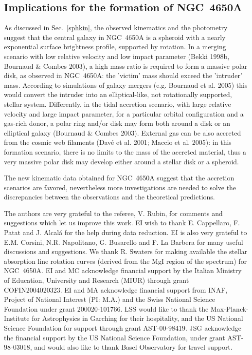 \documentclass[12pt,preprint]{aastex}
\begin{document}
\subsection{Implications for the formation of NGC~4650A} 

As discussed in Sec.~\ref{sphkin}, the observed kinematics and the
photometry suggest that the central galaxy in NGC~4650A is a spheroid
with a nearly exponential surface brightness profile, supported by
rotation.  In a merging scenario with low relative velocity and low
impact parameter (Bekki 1998b, Bournaud \& Combes 2003), a high mass
ratio is required to form a massive polar disk, as observed in
NGC~4650A: the 'victim' mass should exceed the 'intruder'
mass. According to simulations of galaxy mergers (e.g. Bournaud et
al. 2005) this would convert the intruder into an elliptical-like, not
rotationally supported, stellar system. Differently, in the tidal
accretion scenario, with large relative velocity and large impact
parameter, for a particular orbital configuration and a gas-rich
donor, a polar ring and/or disk may form both around a disk or an
elliptical galaxy (Bournaud \& Combes 2003). External gas can be also
accreted from the cosmic web filaments (Dav\'e et al. 2001; Maccio et
al. 2005): in this formation scenario, there is no limits to the mass
of the accreted material, thus a very massive polar disk may develop
either around a stellar disk or a spheroid. 

The new kinematic data obtained for NGC~4650A suggest that the
accretion scenarios are favored, nevertheless more investigations are
needed to solve the discrepancies between the observations and the
theoretical predictions.


\acknowledgments
The authors are very grateful to the referee, V. Rubin, for comments and
suggestions which let us improve this work.  EI wish to thank E. Cappellaro,
F. Patat and J. Alcal\'{a} for the help during data reduction. EI is
also very grateful to E.M. Corsini, N.R. Napolitano, G. Busarello and
F. La Barbera for many useful discussions and suggestions.  We thank
R. Swaters for making available the stellar absorption line rotation
curves (derived from the MgI region of the spectrum) for NGC~4650A. EI
and MC acknowledge financial support by the Italian Ministry of
Education, University and Research (MIUR) through grant COFIN2004020323.
EI and MA acknowledge financial support from INAF, Project of National
Interest (PI: M.A.)  and the Swiss National Science Foundation under
grant 200020-101766. LSS would like to thank the Max-Planck-Institute
for Astrophysics in Garching for their hospitality, and the US
National Science Foundation for support through grant
AST-00-98419. JSG acknowledge the financial support by the US National
Science Foundation, under grant AST-98-03018, and would also like to
thank Basel Observatory for travel support.
\end{document}
